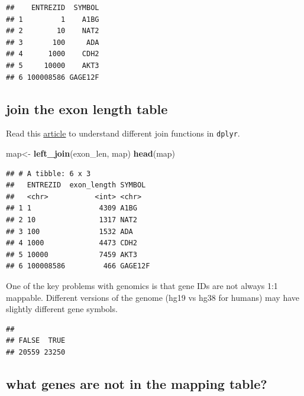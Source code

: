 \documentclass[
]{book}
\newenvironment{Shaded}{\begin{snugshade}}{\end{snugshade}}
\newcommand{\FunctionTok}[1]{\textcolor[rgb]{0.13,0.29,0.53}{\textbf{#1}}}
\newcommand{\NormalTok}[1]{#1}
\newcommand{\OtherTok}[1]{\textcolor[rgb]{0.56,0.35,0.01}{#1}}
\newcommand{\SpecialCharTok}[1]{\textcolor[rgb]{0.81,0.36,0.00}{\textbf{#1}}}
\begin{document}
\begin{verbatim}
##    ENTREZID  SYMBOL
## 1         1    A1BG
## 2        10    NAT2
## 3       100     ADA
## 4      1000    CDH2
## 5     10000    AKT3
## 6 100008586 GAGE12F
\end{verbatim}

\hypertarget{join-the-exon-length-table}{%
\subsection{join the exon length table}\label{join-the-exon-length-table}}

Read this \href{https://dplyr.tidyverse.org/reference/mutate-joins.html}{article} to understand different join functions in \texttt{dplyr}.

\begin{Shaded}
\begin{Highlighting}[]
\NormalTok{map}\OtherTok{\textless{}{-}} \FunctionTok{left\_join}\NormalTok{(exon\_len, map)}
\FunctionTok{head}\NormalTok{(map)}
\end{Highlighting}
\end{Shaded}

\begin{verbatim}
## # A tibble: 6 x 3
##   ENTREZID  exon_length SYMBOL 
##   <chr>           <int> <chr>  
## 1 1                4309 A1BG   
## 2 10               1317 NAT2   
## 3 100              1532 ADA    
## 4 1000             4473 CDH2   
## 5 10000            7459 AKT3   
## 6 100008586         466 GAGE12F
\end{verbatim}

One of the key problems with genomics is that gene IDs are not always 1:1 mappable. Different versions of the genome (hg19 vs hg38 for humans) may have slightly different gene symbols.

\begin{Shaded}
\end{Shaded}

\begin{verbatim}
## 
## FALSE  TRUE 
## 20559 23250
\end{verbatim}

\hypertarget{what-genes-are-not-in-the-mapping-table}{%
\subsection{what genes are not in the mapping table?}\label{what-genes-are-not-in-the-mapping-table}}
\end{document}
